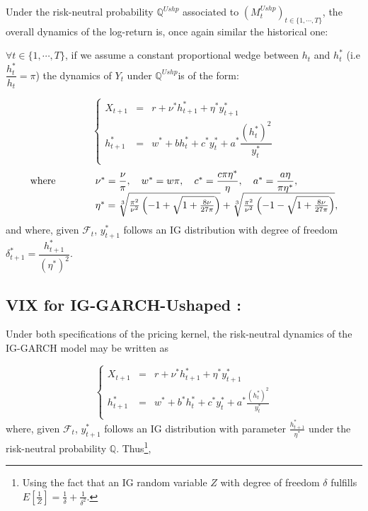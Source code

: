 \documentclass[preprint,times,12pt]{elsarticle}
\begin{document}
Under the risk-neutral probability $\mathbb{Q}^{Ushp}$ associated to $(M^{Ushp}_{t})_{t\in \{1,\cdots,T\}}$, the overall dynamics of the log-return is, once again  similar the historical one: 


    $\forall t\in \{1,\cdots,T\}$, if we assume a constant proportional wedge between $h_t$ and $h_t^*$ (i.e $\dfrac{h^{*}_{t}}{h_{t}} =\pi$) the dynamics of  $Y_{t}$ under   $\mathbb{Q}^{Ushp}$is of the form:

\begin{equation}\label{Quaker}
\left\{
  \begin{array}{rcl}
X_{t+1}  & = &  r +\nu^{*} h^{*}_{t+1} +\eta^{*} y^{*}_{t+1} \\
h^{*}_{t+1}& = &w^{*}+b h^{*}_{t} + c^{*}y^{*}_{t} +a^{*}\dfrac{(h^{*}_{t})^{2}}{y^{*}_{t}}\\
  \end{array}
\right.
\end{equation}
\begin{equation*}
\begin{array}{rl}
\text{where} \qquad \quad&\nu^{*}=\dfrac{\nu}{\pi},\quad w^{*}=w\pi,\quad c^{*}=\dfrac{c\pi \eta^*}{\eta},\quad a^{*}=\dfrac{a\eta}{\pi \eta^*},\\
&\eta^*=\sqrt[3]{{\pi^{2}\over \nu^{2}}\left( -1+\sqrt{1+{8\nu\over 27 \pi}}\right) } +\sqrt[3]{{\pi^{2}\over \nu^{2}}\left( -1-\sqrt{1+{8\nu\over 27 \pi}}\right)},
\end{array}
\end{equation*}
and where, given $\mathcal{F}_t$, $y^{*}_{t+1}$ follows an IG distribution  with degree of freedom $ \delta_{t+1}^{*}=\dfrac{h^{*}_{t+1}}{(\eta^*)^{2}}$.

\subsection{VIX for  IG-GARCH-Ushaped :}

Under both specifications of the pricing kernel, the risk-neutral dynamics of the IG-GARCH  model may be written as 

\begin{equation*}
\left\{
  \begin{array}{rcl}
X_{t+1} & = &  r +\nu^{*} h^{*}_{t+1} +\eta^{*} y^{*}_{t+1} \\
h^{*}_{t+1}& = &w^{*}+b^{*}h^{*}_{t} + c^{*}y^{*}_{t} +a^{*}\frac{(h^{*}_{t})^{2}}{y^{*}_{t}}\\
  \end{array}
\right.
\end{equation*}where, given $\mathcal{F}_t$, $y^{*}_{t+1}$ follows an IG distribution with parameter $\frac{h^*_{t+1}}{\eta^*}$ under the risk-neutral probability $\mathbb{Q}$. Thus\footnote{Using the fact that an IG random variable $Z$ with degree of freedom $\delta$ fulfills $E[\frac{1}{Z}]=\frac{1}{\delta}+\frac{1}{\delta^2}$.},
\end{document}
